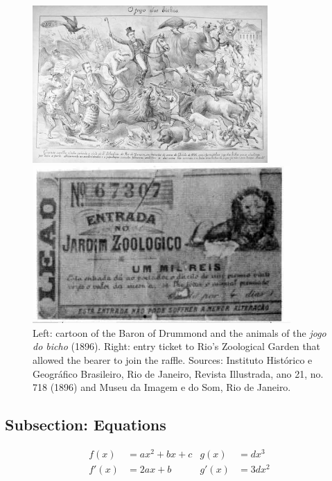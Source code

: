 \documentclass[a4paper,12pt]{article}
\begin{document}
\begin{figure}[!htbp]
 \centering
 \begin{minipage}[b]{0.45\textwidth}
  \includegraphics[width=\textwidth, height=6cm]{images/bicho01.jpg}
 \end{minipage}
 \hfill
 \begin{minipage}[b]{0.45\textwidth}
  \includegraphics[width=\textwidth, height=6cm]{images/bicho02.jpg}
 \end{minipage}
 \caption{Left: cartoon of the Baron of Drummond and the animals of the \emph{jogo do bicho} (1896). Right: entry ticket to Rio's Zoological Garden that allowed the bearer to join the raffle. Sources: Instituto Histórico e Geográfico Brasileiro, Rio de Janeiro, Revista Illustrada, ano 21, no. 718 (1896) and Museu da Imagem e do Som, Rio de Janeiro.}
 \label{fig:barao}
\end{figure}

\newpage

\subsection{Subsection: Equations}
\label{sub:eq}

\begin{align}
 f(x)  &= a x^2+b x +c   &   g(x)  &= d x^3 \\
 f'(x) &= 2 a x +b       &   g'(x) &= 3 d x^2
\end{align}
\end{document}
